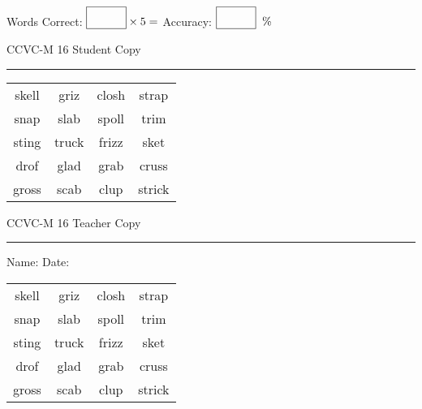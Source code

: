 \documentclass{memoir}
\begin{document}
\small

Words Correct: $\fbox{\phantom{\huge 100}} \times 5 = $ Accuracy: $\fbox{\phantom{\huge 100}}\;\; \%$ 

\vfill

\newpage


\footnotesize \noindent
CCVC-M 16 \hfill Student Copy
\smallskip
\hrule

\Large

\setlength{\tabcolsep}{14pt}
\def\arraystretch{3}

{\selectfont


\begin{vplace}[0.5]
\begin{center}
\begin{tabular}{cccc}
skell & griz & closh            & strap \\
snap & slab             & spoll & trim \\
sting & truck & frizz & sket \\
drof & glad & grab                    & cruss \\
gross                    & scab & clup             & strick \\
\end{tabular}
\end{center}
\end{vplace}

}

\newpage

\footnotesize \noindent
CCVC-M 16 \hfill Teacher Copy
\smallskip
\hrule

\small

\vfill

\noindent
Name: \underline{\hspace{1.75in}} \hfill Date: \underline{\hspace{1in}}

\Large

{\selectfont


\begin{vplace}[0.5]
\begin{center}
\begin{tabular}{cccc}
skell & griz & closh            & strap \\
snap & slab             & spoll & trim \\
sting & truck & frizz & sket \\
drof & glad & grab                    & cruss \\
gross                    & scab & clup             & strick \\
\end{tabular}
\end{center}
\end{vplace}



}
\end{document}
